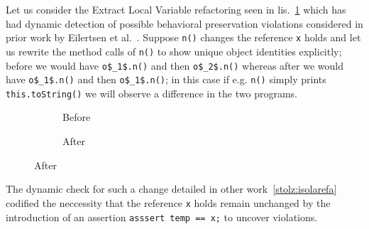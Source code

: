 Let us consider the Extract Local Variable refactoring seen in lis.~\ref{lst:ExtractVariable-java} which has had dynamic detection of
possible behavioral preservation violations considered in prior work by Eilertsen et al.~\cite{stolz:isolarefa}. Suppose \lstinline[style=smallJava]|n()|
changes the reference \lstinline[style=smallJava]|x| holds and let us rewrite the method calls of \lstinline[style=smallJava]|n()| to show unique
object identities explicitly; before we would have \lstinline[mathescape=true,style=smallJava]|o$_1$.n()| and then
\lstinline[mathescape=true,style=smallJava]|o$_2$.n()| whereas after we would have \lstinline[mathescape=true,style=smallJava]|o$_1$.n()|
and then \lstinline[mathescape=true,style=smallJava]|o$_1$.n()|; in this case if e.g. \lstinline[mathescape=true,style=smallJava]|n()|
simply prints \lstinline[mathescape=true,style=smallJava]|this.toString()| we will observe a difference in the two programs.

\begin{figure}[!h]
  \centering
  \begin{subfigure}{.2\linewidth}
    
    \caption{Before}
  \end{subfigure}\hspace{1cm}
  \begin{subfigure}{.3\linewidth}
    
    \caption{After}
  \end{subfigure}
\label{lst:ExtractVariable-java}
\end{figure}

The dynamic check for such a change detailed in other work~\ref{stolz:isolarefa} codified the neccessity that the reference \lstinline[style=smallJava]|x|
holds remain unchanged by the introduction of an assertion \lstinline[style=smallJava]|asssert temp == x;| to uncover violations.

